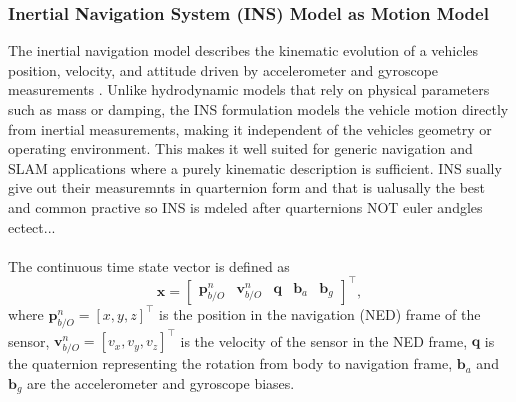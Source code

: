 \subsubsection{Inertial Navigation System (INS) Model as Motion Model}
The inertial navigation model describes the kinematic evolution of a vehicles position, velocity, and attitude driven by accelerometer and gyroscope measurements \cite{sensor_fusion_book}. Unlike hydrodynamic models that rely on physical parameters such as mass or damping, the INS formulation models the vehicle motion directly from inertial measurements, making it independent of the vehicles geometry or operating environment. This makes it well suited for generic navigation and SLAM applications where a purely kinematic description is sufficient. INS sually give out their measuremnts in quarternion form and that is ualusally the best and common practive so INS is mdeled after quarternions NOT euler andgles ectect...
\\ \\
The continuous time state vector is defined as
$$
    \mathbf{x} =
    \begin{bmatrix}
        \mathbf{p}_{b/O}^{n} & \mathbf{v}_{b/O}^{n} & \mathbf{q} & \mathbf{b}_a & \mathbf{b}_g
    \end{bmatrix}^\top,
$$
where $\mathbf{p}_{b/O}^{n} = [x, y, z]^\top$ is the position in the navigation (NED) frame of the sensor, $\mathbf{v}_{b/O}^{n} = [v_x, v_y, v_z]^\top$ is the velocity of the sensor in the NED frame, $\mathbf{q}$ is the quaternion representing the rotation from body to navigation frame, $\mathbf{b}_a$ and $\mathbf{b}_g$ are the accelerometer and gyroscope biases.  




